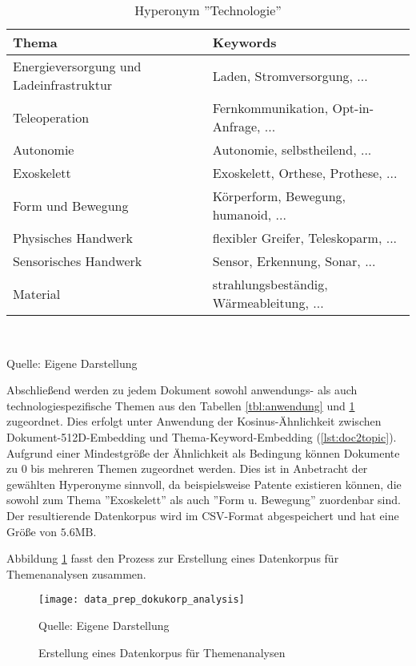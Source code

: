\begin{table}[H]
	\caption{Hyperonym ''Technologie''}
	\label{tbl:technology}
	\begin{tabularx}{\textwidth}{X|X}
		\hline
		\textbf{Thema} & \textbf{Keywords} \\
		\hline
		Energieversorgung und Ladeinfrastruktur & Laden, Stromversorgung, ... \\
		\hline
		Teleoperation & Fernkommunikation, Opt-in-Anfrage, ... \\
		\hline
		Autonomie & Autonomie, selbstheilend, ... \\
		\hline
		Exoskelett & Exoskelett, Orthese, Prothese, ... \\
		\hline
		Form und Bewegung & Körperform, Bewegung, humanoid, ... \\
		\hline
		Physisches Handwerk & flexibler Greifer, Teleskoparm, ... \\
		\hline
		Sensorisches Handwerk & Sensor, Erkennung, Sonar, ... \\
		\hline
		Material & strahlungsbeständig, Wärmeableitung, ... \\
		\hline
	\end{tabularx} \\
	\vspace{0.5em}
	\raggedright
	\normalsize{Quelle: Eigene Darstellung}
	\vspace{-1.0em}
\end{table}
Abschließend werden zu jedem Dokument sowohl anwendungs- als auch technologiespezifische Themen aus den Tabellen \ref{tbl:anwendung} und \ref{tbl:technology} zugeordnet. Dies erfolgt unter Anwendung der Kosinus-Ähnlichkeit zwischen Dokument-512D-Embedding und Thema-Keyword-Embedding (\ref{lst:doc2topic}). Aufgrund einer Mindestgröße der Ähnlichkeit als Bedingung können Dokumente zu 0 bis mehreren Themen zugeordnet werden. Dies ist in Anbetracht der gewählten Hyperonyme sinnvoll, da beispielsweise Patente existieren können, die sowohl zum Thema ''Exoskelett'' als auch ''Form u. Bewegung'' zuordenbar sind. Der resultierende Datenkorpus wird im CSV-Format abgespeichert und hat eine Größe von $5.6\text{MB}$.

Abbildung \ref{fig:data_prep_dokukorp_analysis} fasst den Prozess zur Erstellung eines Datenkorpus für Themenanalysen zusammen. 
\begin{figure}[H]
	\centering
	\texttt{[image: data\_prep\_dokukorp\_analysis]}
	\caption{Erstellung eines Datenkorpus für Themenanalysen}
	\label{fig:data_prep_dokukorp_analysis}
	\vspace{0.5em}
	\raggedright
	\normalsize{Quelle: Eigene Darstellung}
	\vspace{-2.0em}
\end{figure}


